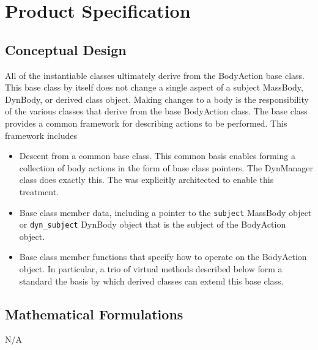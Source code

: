 %

\chapter{Product Specification}\label{ch:\modelpartid:spec}

\section{Conceptual Design}
All of the instantiable \ModelDesc classes ultimately derive from the BodyAction
base class. This base class by itself does not change a single aspect of
a subject MassBody, DynBody, or derived class object. Making changes to a body is the
responsibility of the various classes that derive from the base BodyAction
class. The base class provides a common framework for describing actions to be
performed. This framework includes
\begin{itemize}
\item Descent from a common base class. This common basis enables forming a
collection of body actions in the form of base class pointers. The DynManager
class does exactly this. The \ModelDesc was explicitly architected to enable
this treatment.
\item Base class member data, including a pointer to the {\tt subject} MassBody object or
{\tt dyn\_subject} DynBody object that is the subject of the BodyAction object.
\item Base class member functions that specify how to operate on the BodyAction
object. In particular, a trio of virtual methods described below
form a standard the basis by which derived classes can extend this base class.
\end{itemize}

\section{Mathematical Formulations}
N/A
